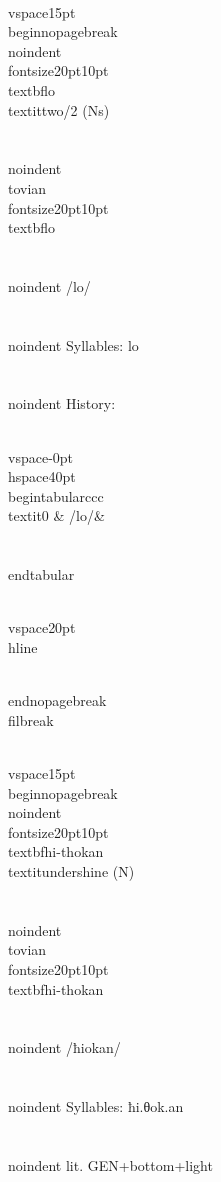 \\vspace{15pt}
\\begin{nopagebreak}
\\noindent{\\fontsize{20pt}{10pt}\\textbf{lo} } \\textit{two/2} (Ns)\\\\
\\noindent {\\tovian \\fontsize{20pt}{10pt} \\textbf{lo} }\\\\
\\noindent /l{\textprimstress}o/\\\\
\\noindent Syllables: lo\\\\


\\noindent History:

\\vspace{-0pt}
\\hspace{40pt}
\\begin{tabular}{ccc}
\\textit{0} & /lo/& \\\\
\\end{tabular}

\\vspace{20pt}\\hline

\\end{nopagebreak}
\\filbreak



\\vspace{15pt}
\\begin{nopagebreak}
\\noindent{\\fontsize{20pt}{10pt}\\textbf{hi-thokan} } \\textit{undershine} (N)\\\\
\\noindent {\\tovian \\fontsize{20pt}{10pt} \\textbf{hi-thokan} }\\\\
\\noindent /ħi{\texttheta}{\textprimstress}okan/\\\\
\\noindent Syllables: ħi.θok.an\\\\
\\noindent lit. GEN+bottom+light\\\\


